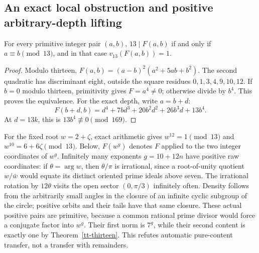 \subsection{An exact local obstruction and positive arbitrary-depth lifting}
\begin{theorem}\label{tt-thirteen}
For every primitive integer pair $(a,b)$,
$13\mid F(a,b)$ if and only if $a\equiv b\pmod{13}$, and in that case
$v_{13}(F(a,b))=1$.
\end{theorem}
\begin{proof}
Modulo thirteen,
$F(a,b)=(a-b)^2(a^2+5ab+b^2)$. The second quadratic has discriminant
eight, outside the square residues $0,1,3,4,9,10,12$.
If $b=0$ modulo thirteen, primitivity gives $F=a^4\ne0$; otherwise divide
by $b^4$. This proves the equivalence. For the exact depth, write $a=b+d$:
\[
 F(b+d,b)=d^4+7bd^3+20b^2d^2+26b^3d+13b^4.
\]
At $d=13k$, this is $13b^4\not\equiv0\pmod{169}$.
\end{proof}

For the fixed root $w=2+\zeta$, exact arithmetic gives
$w^{12}=1\pmod{13}$ and $w^{10}=6+6\zeta\pmod{13}$.
Below, $F(w^g)$ denotes $F$ applied to the two integer coordinates of $w^g$.
Infinitely many exponents $g=10+12n$ have positive raw coordinates:
if $\theta=\arg w$, then $\theta/\pi$ is irrational, since a root-of-unity
quotient $w/\bar w$ would equate its distinct oriented prime ideals above
seven. The irrational rotation by $12\theta$ visits the open sector
$(0,\pi/3)$ infinitely often. Density follows from the arbitrarily small
angles in the closure of an infinite cyclic subgroup of the circle; positive
orbits and their tails have that same closure.
These actual positive pairs are primitive, because a common rational prime
divisor would force a conjugate factor into $w^g$. Their first norm is $7^g$,
while their second content is exactly one by Theorem~\ref{tt-thirteen}.
This refutes automatic pure-content transfer, not a transfer with remainders.

